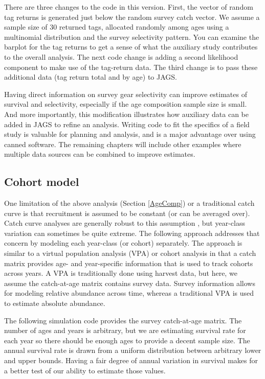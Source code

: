 \documentclass[
]{krantz}
\begin{document}
There are three changes to the code in this version. First, the vector of random tag returns is generated just below the random survey catch vector. We assume a sample size of 30 returned tags, allocated randomly among ages using a multinomial distribution and the survey selectivity pattern. You can examine the barplot for the tag returns to get a sense of what the auxiliary study contributes to the overall analysis. The next code change is adding a second likelihood component to make use of the tag-return data. The third change is to pass these additional data (tag return total and by age) to JAGS.

Having direct information on survey gear selectivity can improve estimates of survival and selectivity, especially if the age composition sample size is small. And more importantly, this modification illustrates how auxiliary data can be added in JAGS to refine an analysis. Writing code to fit the specifics of a field study is valuable for planning and analysis, and is a major advantage over using canned software. The remaining chapters will include other examples where multiple data sources can be combined to improve estimates.

\hypertarget{Cohort}{%
\subsection{Cohort model}\label{Cohort}}

One limitation of the above analysis (Section \ref{AgeComp}) or a traditional catch curve is that recruitment is assumed to be constant (or can be averaged over). Catch curve analyses are generally robust to this assumption \citep{allen_1997}, but year-class variation can sometimes be quite extreme. The following approach addresses that concern by modeling each year-class (or cohort) separately. The approach is similar to a virtual population analysis (VPA) or cohort analysis \citep{ricker1975} in that a catch matrix provides age- and year-specific information that is used to track cohorts across years. A VPA is traditionally done using harvest data, but here, we assume the catch-at-age matrix contains survey data. Survey information allows for modeling relative abundance across time, whereas a traditional VPA is used to estimate absolute abundance.

The following simulation code provides the survey catch-at-age matrix. The number of ages and years is arbitrary, but we are estimating survival rate for each year so there should be enough ages to provide a decent sample size. The annual survival rate is drawn from a uniform distribution between arbitrary lower and upper bounds. Having a fair degree of annual variation in survival makes for a better test of our ability to estimate those values.
\end{document}
